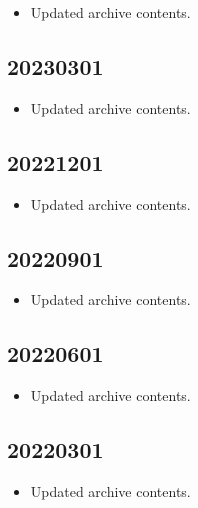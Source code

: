 \documentclass[hidelinks,a4paper,12pt]{article}
\begin{document}
\begin{itemize}
\item Updated archive contents.
\end{itemize}

\subsection{20230301}  \label{sec:changelog_20230301}

\begin{itemize}
\item Updated archive contents.
\end{itemize}

\subsection{20221201}  \label{sec:changelog_20221201}

\begin{itemize}
\item Updated archive contents.
\end{itemize}

\subsection{20220901}  \label{sec:changelog_20220901}

\begin{itemize}
\item Updated archive contents.
\end{itemize}

\subsection{20220601}  \label{sec:changelog_20220601}

\begin{itemize}
\item Updated archive contents.
\end{itemize}

\subsection{20220301}  \label{sec:changelog_20220301}

\begin{itemize}
\item Updated archive contents.
\end{itemize}
\end{document}
